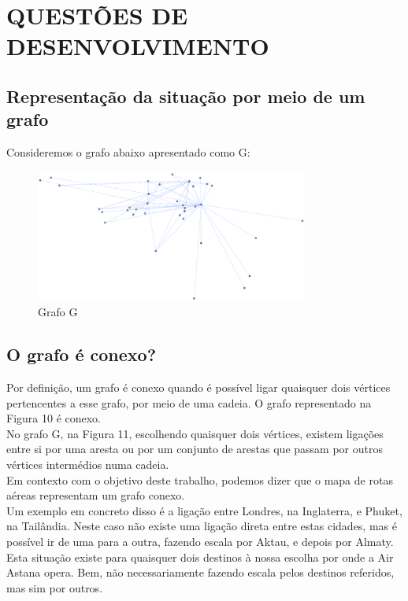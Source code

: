 \clearpage
\section{QUESTÕES DE DESENVOLVIMENTO}
\label{section}
\subsection{Representação da situação por meio de um grafo}
Consideremos o grafo abaixo apresentado como G:\\
\begin{figure}[h]
    \centering
    \includegraphics[width=0.8\textwidth]{imgs/Figura11}
    \caption{Grafo G\label{fig:imagem11}}
\end{figure}
\subsection{ O grafo é conexo?}
\indent Por definição, um grafo é conexo quando é possível ligar quaisquer dois vértices pertencentes a esse grafo, por meio de uma cadeia. O grafo representado na Figura 10 é conexo.\\
\indent No grafo G, na Figura 11, escolhendo quaisquer dois vértices, existem ligações entre si por uma aresta ou por um conjunto de arestas que passam por outros vértices intermédios numa cadeia.\\
\indent Em contexto com o objetivo deste trabalho, podemos dizer que o mapa de rotas aéreas representam um 
grafo conexo.\\
\indent Um exemplo em concreto disso é a ligação entre Londres, na Inglaterra, e Phuket, na Tailândia. Neste 
caso não existe uma ligação direta entre estas cidades, mas é possível ir de uma para a outra, fazendo escala 
por Aktau, e depois por Almaty. Esta situação existe para quaisquer dois destinos à nossa escolha por onde a 
Air Astana opera. Bem, não necessariamente fazendo escala pelos destinos referidos, mas sim por outros.\\
